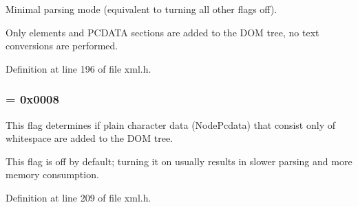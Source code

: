 Minimal parsing mode (equivalent to turning all other flags off). 

Only elements and PCDATA sections are added to the DOM tree, no text conversions are performed. 

Definition at line 196 of file xml.h.

\hypertarget{namespacephys_1_1xml_a48c0da99d1ed62b1a4984293e64828c6}{
\subsubsection[{ParseWsPcdata}]{ = 0x0008}}
\label{d9/d27/namespacephys_1_1xml_a48c0da99d1ed62b1a4984293e64828c6}


This flag determines if plain character data (NodePcdata) that consist only of whitespace are added to the DOM tree. 

This flag is off by default; turning it on usually results in slower parsing and more memory consumption. 

Definition at line 209 of file xml.h.

